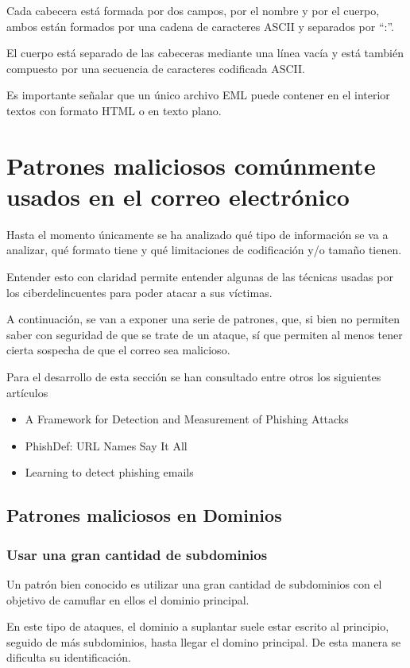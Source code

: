 Cada cabecera está formada por dos campos, por el nombre y por el cuerpo, ambos están formados por una cadena de caracteres ASCII y separados por “:”.

El cuerpo está separado de las cabeceras mediante una línea vacía y está también compuesto por una secuencia de caracteres codificada ASCII. 

Es importante señalar que un único archivo EML puede contener en el interior textos con formato HTML o en texto plano.

\section{Patrones maliciosos comúnmente usados en el correo electrónico}
Hasta el momento únicamente se ha analizado qué tipo de información se va a analizar, qué formato tiene y qué limitaciones de codificación y/o tamaño tienen. 

Entender esto con claridad permite entender algunas de las técnicas usadas por los ciberdelincuentes para poder atacar a sus víctimas. 

A continuación, se van a exponer una serie de patrones, que, si bien no permiten saber con seguridad de que se trate de un ataque, sí que permiten al menos tener cierta sospecha de que el correo sea malicioso.

Para el desarrollo de esta sección se han consultado entre otros los siguientes artículos 

\begin{itemize}
    \item A Framework for Detection and Measurement of Phishing Attacks \cite{phishing1}
    \item PhishDef: URL Names Say It All \cite{phishing2}
    \item Learning to detect phishing emails \cite{phishing3}
\end{itemize}

\subsection{Patrones maliciosos en Dominios}
\subsubsection{Usar una gran cantidad de subdominios}
Un patrón bien conocido es utilizar una gran cantidad de subdominios con el objetivo de camuflar en ellos el dominio principal. 

En este tipo de ataques, el dominio a suplantar suele estar escrito al principio, seguido de más subdominios, hasta llegar el domino principal. De esta manera se dificulta su identificación. 

